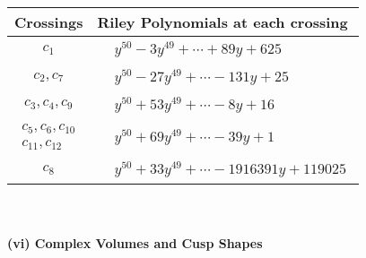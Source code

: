 \documentclass[1p]{elsarticle_modified}
\theoremstyle{definition}
\begin{document}
\begin{tabular}{m{50pt}|m{274pt}}
Crossings & \hspace{64pt}Riley Polynomials at each crossing \\
\hline $$\begin{aligned}c_{1}\end{aligned}$$&$\begin{aligned}
&y^{50}-3 y^{49}+\cdots+89 y+625
\end{aligned}$\\
\hline $$\begin{aligned}c_{2},c_{7}\end{aligned}$$&$\begin{aligned}
&y^{50}-27 y^{49}+\cdots-131 y+25
\end{aligned}$\\
\hline $$\begin{aligned}c_{3},c_{4},c_{9}\end{aligned}$$&$\begin{aligned}
&y^{50}+53 y^{49}+\cdots-8 y+16
\end{aligned}$\\
\hline $$\begin{aligned}c_{5},c_{6},c_{10}\\c_{11},c_{12}\end{aligned}$$&$\begin{aligned}
&y^{50}+69 y^{49}+\cdots-39 y+1
\end{aligned}$\\
\hline $$\begin{aligned}c_{8}\end{aligned}$$&$\begin{aligned}
&y^{50}+33 y^{49}+\cdots-1916391 y+119025
\end{aligned}$\\
\hline
\end{tabular}\\~\\
\newpage\flushleft \textbf{(vi) Complex Volumes and Cusp Shapes}
\end{document}
